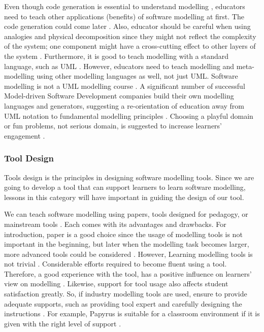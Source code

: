 \documentclass[12pt, a4paper]{report}
\begin{document}
{Even though code generation is essential to understand modelling \cite{liebel2015ready}, educators need to teach other applications (benefits) of software modelling at first. The code generation could come later \cite{paige2014bad}. Also, educator should be careful when using analogies and physical decomposition since they might not reflect the complexity of the system; one component might have a cross-cutting effect to other layers of the system \cite{paige2014bad}. Furthermore, it is good to teach modelling with a standard language, such as UML \cite{bezivin2009teaching}. However, educators need to teach modelling and meta-modelling using other modelling languages as well, not just UML. Software modelling is not a UML modelling course \cite{paige2014bad}. A significant number of successful Model-driven Software Development companies build their own modelling languages and generators, suggesting a re-orientation of education away from UML notation to fundamental modelling principles \cite{whittle2013industrial}. Choosing a playful domain or fun problems, not serious domain, is suggested to increase learners' engagement \cite{paige2014bad}.

\subsubsection{Tool Design}
Tools design is the principles in designing software modelling tools. Since we are going to develop a tool that can support learners to learn software modelling, lessons in this category will have important in guiding the design of our tool. 

We can teach software modelling using papers, tools designed for pedagogy, or mainstream tools \cite{Akayama2013}. Each comes with its advantages and drawbacks. For introduction, paper is a good choice since the usage of modelling tools is not important in the beginning, but later when the modelling task becomes larger, more advanced tools could be considered \cite{bezivin2009teaching}. However, Learning modelling tools is not trivial \cite{paige2014bad}. Considerable efforts required to become fluent using a tool. Therefore, a good experience with the tool, has a positive inﬂuence on learners' view on modelling \cite{liebel2015ready}. Likewise, support for tool usage also affects student satisfaction greatly. So, if industry modelling tools are used, ensure to provide adequate supports, such as providing tool expert and carefully designing the instructions \cite{liebel2015ready}. For example, Papyrus is suitable for a classroom environment if it is given with the right level of support \cite{liebel2015ready}.

}
\end{document}
